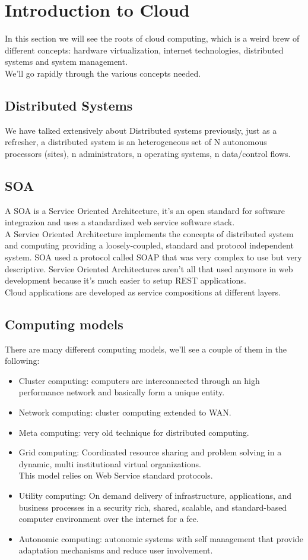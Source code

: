 \section{Introduction to Cloud}
In this section we will see the roots of cloud computing, which is a weird brew of different concepts: hardware virtualization, internet technologies, distributed systems and system management. \\
We'll go rapidly through the various concepts needed.
\subsection{Distributed Systems}
We have talked extensively about Distributed systems previously, just as a refresher, a distributed system is an heterogeneous set of N autonomous processors (sites), n administrators, n operating systems, n data/control flows.
\subsection{SOA}
A SOA is a Service Oriented Architecture, it's an open standard for software integrazion and uses a standardized web service software stack. \\
A Service Oriented Architecture implements the concepts of distributed system and computing providing a loosely-coupled, standard and protocol independent system. SOA used a protocol called SOAP that was very complex to use but very descriptive. Service Oriented Architectures aren't all that used anymore in web development because it's much easier to setup REST applications. \\
Cloud applications are developed as service compositions at different layers.
\subsection{Computing models}
There are many different computing models, we'll see a couple of them in the following:
\begin{itemize}
    \item Cluster computing: computers are interconnected through an high performance network and basically form a unique entity.
    \item Network computing: cluster computing extended to WAN.
    \item Meta computing: very old technique for distributed computing.
    \item Grid computing: Coordinated resource sharing and problem solving in a dynamic, multi institutional virtual organizations. \\
    This model relies on Web Service standard protocols.
    \item Utility computing: On demand delivery of infrastructure, applications, and business processes in a security rich, shared, scalable, and standard-based computer environment over the internet for a fee.
    \item Autonomic computing: autonomic systems with self management that provide adaptation mechanisms and reduce user involvement.
\end{itemize}
